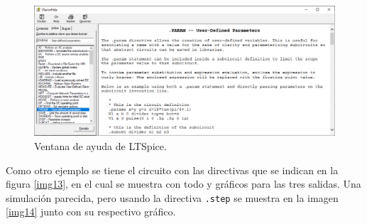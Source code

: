\documentclass[a4paper]{article} %
\begin{document}
\begin{figure} %
	\centering %
	\includegraphics[scale=0.3]{IMAGENES/img12} %
	\caption{Ventana de ayuda de LTSpice.} %
	\label{img12} %
\end{figure} %

Como otro ejemplo se tiene el circuito con las directivas que se indican en la figura \eqref{img13}, en el cual se muestra con todo y gráficos para las tres salidas. Una simulación parecida, pero usando la directiva \texttt{.step} se muestra en la imagen \eqref{img14} junto con su respectivo gráfico.
\end{document}
